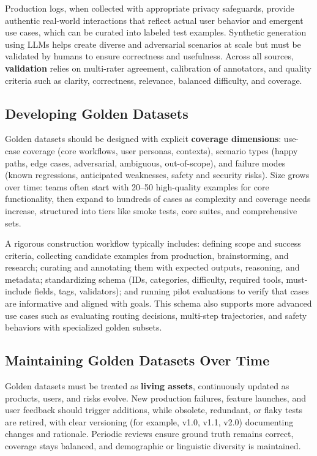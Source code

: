 \begin{TNtwocol}
Production logs, when collected with appropriate privacy safeguards, provide authentic real-world interactions that reflect actual user behavior and emergent use cases, which can be curated into labeled test examples. Synthetic generation using LLMs helps create diverse and adversarial scenarios at scale but must be validated by humans to ensure correctness and usefulness. Across all sources, \textbf{validation} relies on multi-rater agreement, calibration of annotators, and quality criteria such as clarity, correctness, relevance, balanced difficulty, and coverage.

\subsection*{Developing Golden Datasets}

Golden datasets should be designed with explicit \textbf{coverage dimensions}: use-case coverage (core workflows, user personas, contexts), scenario types (happy paths, edge cases, adversarial, ambiguous, out-of-scope), and failure modes (known regressions, anticipated weaknesses, safety and security risks). Size grows over time: teams often start with 20–50 high-quality examples for core functionality, then expand to hundreds of cases as complexity and coverage needs increase, structured into tiers like smoke tests, core suites, and comprehensive sets.

A rigorous construction workflow typically includes: defining scope and success criteria, collecting candidate examples from production, brainstorming, and research; curating and annotating them with expected outputs, reasoning, and metadata; standardizing schema (IDs, categories, difficulty, required tools, must-include fields, tags, validators); and running pilot evaluations to verify that cases are informative and aligned with goals. This schema also supports more advanced use cases such as evaluating routing decisions, multi-step trajectories, and safety behaviors with specialized golden subsets.

\subsection*{Maintaining Golden Datasets Over Time}

Golden datasets must be treated as \textbf{living assets}, continuously updated as products, users, and risks evolve. New production failures, feature launches, and user feedback should trigger additions, while obsolete, redundant, or flaky tests are retired, with clear versioning (for example, v1.0, v1.1, v2.0) documenting changes and rationale. Periodic reviews ensure ground truth remains correct, coverage stays balanced, and demographic or linguistic diversity is maintained.


\end{TNtwocol}
